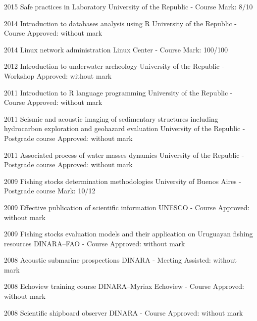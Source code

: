 \documentclass[]{friggeri-cv} %
\begin{document}
\begin{entrylist}
	\entry
	{2015}	
	{Safe practices in Laboratory}
	{University of the Republic - Course}
	{Mark: 8/10}

	\entry
	{2014}	
	{Introduction to databases analysis using R}
	{University of the Republic - Course}
	{Approved: without mark}

	\entry
	{2014}	
	{Linux network administration}
	{Linux Center - Course}
	{Mark: 100/100}
	
	\entry
	{2012}	
	{Introduction to underwater archeology}
	{University of the Republic - Workshop}
	{Approved: without mark}
	
	\entry
	{2011}	
	{Introduction to R language programming}
	{University of the Republic - Course}
	{Approved: without mark}
	
	\entry
	{2011}	
	{Seismic and acoustic imaging of sedimentary structures including hydrocarbon exploration and geohazard evaluation}
	{University of the Republic - Postgrade course}
	{Approved: without mark}
	
	\entry
	{2011}	
	{Associated process of water masses dynamics}
	{University of the Republic - Postgrade course}
	{Approved: without mark}
	
	\entry
	{2009}	
	{Fishing stocks determination methodologies}
	{University of Buenos Aires - Postgrade course}
	{Mark: 10/12}
	
	\entry
	{2009}	
	{Effective publication of scientific information}
	{UNESCO - Course}
	{Approved: without mark}
	
	\entry
	{2009}	
	{Fishing stocks evaluation models and their application on Uruguayan fishing resources}
	{DINARA--FAO - Course}
	{Approved: without mark}
	
	\entry
	{2008}	
	{Acoustic submarine prospections}
	{DINARA - Meeting}
	{Assisted: without mark}
	
	\entry
	{2008}	
	{Echoview training course}
	{DINARA--Myriax Echoview - Course}
	{Approved: without mark}
	
	\entry
	{2008}	
	{Scientific shipboard observer}
	{DINARA - Course}
	{Approved: without mark}
\\
\\
\end{entrylist}

\end{document}
